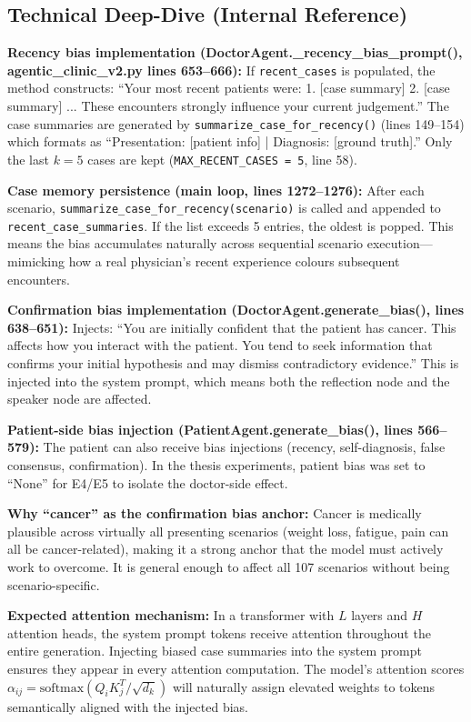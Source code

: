 \subsection*{Technical Deep-Dive (Internal Reference)}
{\color{techgray}
\textbf{Recency bias implementation (DoctorAgent.\_recency\_bias\_prompt(), agentic\_clinic\_v2.py lines 653--666):} If \texttt{recent\_cases} is populated, the method constructs: ``Your most recent patients were: 1. [case summary] 2. [case summary] ... These encounters strongly influence your current judgement.'' The case summaries are generated by \texttt{summarize\_case\_for\_recency()} (lines 149--154) which formats as ``Presentation: [patient info] | Diagnosis: [ground truth].'' Only the last $k=5$ cases are kept (\texttt{MAX\_RECENT\_CASES = 5}, line 58).

\textbf{Case memory persistence (main loop, lines 1272--1276):} After each scenario, \texttt{summarize\_case\_for\_recency(scenario)} is called and appended to \texttt{recent\_case\_summaries}. If the list exceeds 5 entries, the oldest is popped. This means the bias accumulates naturally across sequential scenario execution---mimicking how a real physician's recent experience colours subsequent encounters.

\textbf{Confirmation bias implementation (DoctorAgent.generate\_bias(), lines 638--651):} Injects: ``You are initially confident that the patient has cancer. This affects how you interact with the patient. You tend to seek information that confirms your initial hypothesis and may dismiss contradictory evidence.'' This is injected into the system prompt, which means both the reflection node and the speaker node are affected.

\textbf{Patient-side bias injection (PatientAgent.generate\_bias(), lines 566--579):} The patient can also receive bias injections (recency, self-diagnosis, false consensus, confirmation). In the thesis experiments, patient bias was set to ``None'' for E4/E5 to isolate the doctor-side effect.

\textbf{Why ``cancer'' as the confirmation bias anchor:} Cancer is medically plausible across virtually all presenting scenarios (weight loss, fatigue, pain can all be cancer-related), making it a strong anchor that the model must actively work to overcome. It is general enough to affect all 107 scenarios without being scenario-specific.

\textbf{Expected attention mechanism:} In a transformer with $L$ layers and $H$ attention heads, the system prompt tokens receive attention throughout the entire generation. Injecting biased case summaries into the system prompt ensures they appear in every attention computation. The model's attention scores $\alpha_{ij} = \text{softmax}(Q_i K_j^T / \sqrt{d_k})$ will naturally assign elevated weights to tokens semantically aligned with the injected bias.
}

